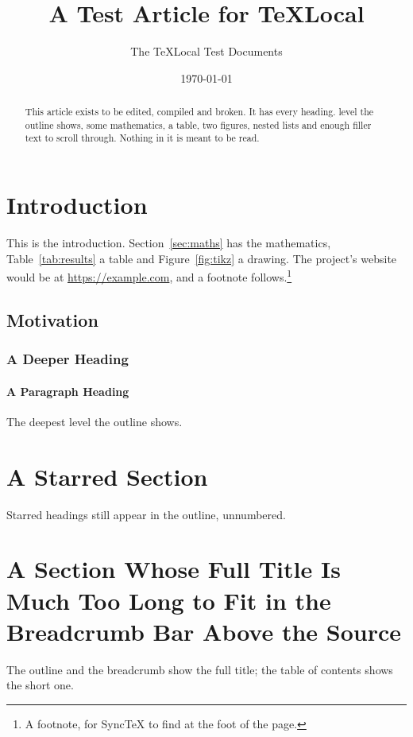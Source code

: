 \documentclass[11pt]{article}
\title{A Test Article for TeXLocal}
\author{The TeXLocal Test Documents}
\date{\today}
\theoremstyle{definition}
\begin{document}
\maketitle

\begin{abstract}
This article exists to be edited, compiled and broken. It has every heading. 
level the outline shows, some mathematics, a table, two figures, nested lists
and enough filler text to scroll through. Nothing in it is meant to be read.
\end{abstract}

\tableofcontents

\section{Introduction}\label{sec:intro}
This is the introduction. Section~\ref{sec:maths} has the mathematics,
Table~\ref{tab:results} a table and Figure~\ref{fig:tikz} a drawing. The
project's website would be at \url{https://example.com}, and a footnote
follows.\footnote{A footnote, for SyncTeX to find at the foot of the page.}

\subsection{Motivation}
\lipsum[1]

\subsubsection{A Deeper Heading}
\lipsum[2]

\paragraph{A Paragraph Heading}
The deepest level the outline shows. \lipsum[3][1-4]

\section*{A Starred Section}
Starred headings still appear in the outline, unnumbered.
\lipsum[4]

\section[Short Title]{A Section Whose Full Title Is Much Too Long to Fit in the Breadcrumb Bar Above the Source}
The outline and the breadcrumb show the full title; the table of contents shows
the short one.
\end{document}
